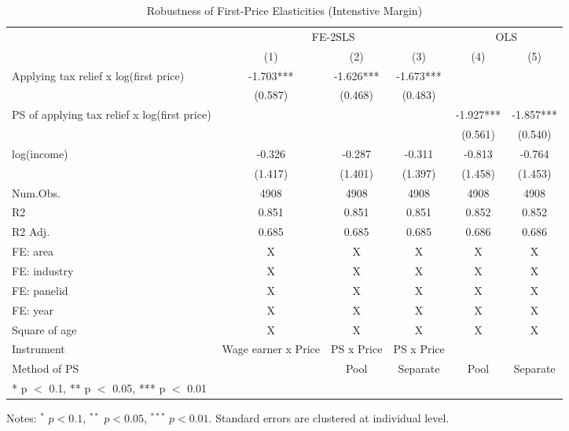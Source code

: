 \documentclass[
  11pt,
  a4paper,
]{article}
\begin{document}
\begin{table}

\caption{\label{tab:rob1intensive}Robustness of First-Price Elasticities (Intenstive Margin)}
\centering
\fontsize{9}{11}\selectfont
\begin{threeparttable}
\begin{tabular}[t]{lccccc}
\toprule
\multicolumn{1}{c}{ } & \multicolumn{3}{c}{FE-2SLS} & \multicolumn{2}{c}{OLS} \\
\cmidrule(l{3pt}r{3pt}){2-4} \cmidrule(l{3pt}r{3pt}){5-6}
  & (1) & (2) & (3) & (4) & (5)\\
\midrule
Applying tax relief x log(first price) & -1.703*** & -1.626*** & -1.673*** &  & \\
 & (0.587) & (0.468) & (0.483) &  & \\
PS of applying tax relief x log(first price) &  &  &  & -1.927*** & -1.857***\\
 &  &  &  & (0.561) & (0.540)\\
log(income) & -0.326 & -0.287 & -0.311 & -0.813 & -0.764\\
 & (1.417) & (1.401) & (1.397) & (1.458) & (1.453)\\
\midrule
Num.Obs. & 4908 & 4908 & 4908 & 4908 & 4908\\
R2 & 0.851 & 0.851 & 0.851 & 0.852 & 0.852\\
R2 Adj. & 0.685 & 0.685 & 0.685 & 0.686 & 0.686\\
FE: area & X & X & X & X & X\\
FE: industry & X & X & X & X & X\\
FE: panelid & X & X & X & X & X\\
FE: year & X & X & X & X & X\\
Square of age & X & X & X & X & X\\
Instrument & Wage earner x Price & PS x Price & PS x Price &  & \\
Method of PS &  & Pool & Separate & Pool & Separate\\
\bottomrule
\multicolumn{6}{l}{\rule{0pt}{1em}* p $<$ 0.1, ** p $<$ 0.05, *** p $<$ 0.01}\\
\end{tabular}
\begin{tablenotes}
\item Notes: $^{*}$ $p < 0.1$, $^{**}$ $p < 0.05$, $^{***}$ $p < 0.01$. Standard errors are clustered at individual level.
\end{tablenotes}
\end{threeparttable}
\end{table}
\end{document}
